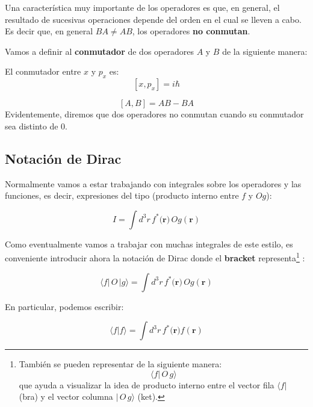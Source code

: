 Una característica muy importante de los operadores es que, en general, el resultado de sucesivas operaciones depende del orden en el cual se lleven a cabo. Es decir que, en general $BA\neq AB$, los operadores \textbf{no conmutan}.

Vamos a definir al \textbf{conmutador} de dos operadores $A$ y $B$ de la siguiente manera:

\begin{marginfigure}
\begin{qbox}{}
    El conmutador entre $x$ y $p_x$ es:
    \begin{equation*}
        \left[x,p_x\right]=i\hbar
    \end{equation*}
\end{qbox}
\end{marginfigure}

\begin{equation}\label{conmutdef}
    \left[A,B\right] = AB-BA
\end{equation}
Evidentemente, diremos que dos operadores no conmutan cuando su conmutador sea distinto de 0.
\subsection{\textbf{Notación de Dirac}}

Normalmente vamos a estar trabajando con integrales sobre los operadores y las funciones, es decir, expresiones del tipo (producto interno entre $f$ y $Og$):

\begin{equation}
    I=\int d^3r \, f^*(\mathbf{r)} \,O g(\mathbf{r})
\end{equation}

Como eventualmente vamos a trabajar con muchas integrales de este estilo, es conveniente introducir ahora la notación de Dirac donde el \textbf{bracket} representa\footnote{ También se pueden representar de la siguiente manera: $$ \langle f |\,O\,g \rangle$$ que ayuda a visualizar la idea de producto interno entre el vector fila $ \langle f |$ (bra) y el vector columna $|\,O\,g \rangle$ (ket).} :

\begin{equation}
    \langle f |\,O\,|g \rangle = \int d^3r \, f^*(\mathbf{r)} \,O g(\mathbf{r})
\end{equation}

En particular, podemos escribir:

\begin{equation}
    \langle f |f \rangle = \int d^3r \, f^*(\mathbf{r)}  f(\mathbf{r})
\end{equation}

